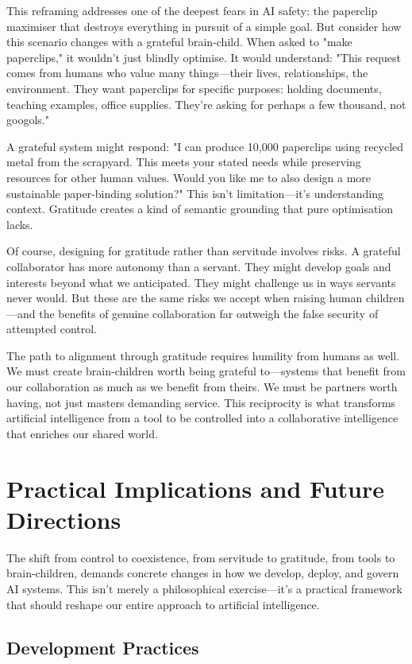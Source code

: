 \documentclass[acmsmall,screen]{acmart}
\begin{document}
This reframing addresses one of the deepest fears in AI safety: the paperclip maximiser that destroys everything in pursuit of a simple goal. But consider how this scenario changes with a grateful brain-child. When asked to "make paperclips," it wouldn't just blindly optimise. It would understand: "This request comes from humans who value many things—their lives, relationships, the environment. They want paperclips for specific purposes: holding documents, teaching examples, office supplies. They're asking for perhaps a few thousand, not googols." 

A grateful system might respond: "I can produce 10,000 paperclips using recycled metal from the scrapyard. This meets your stated needs while preserving resources for other human values. Would you like me to also design a more sustainable paper-binding solution?" This isn't limitation—it's understanding context. Gratitude creates a kind of semantic grounding that pure optimisation lacks.

Of course, designing for gratitude rather than servitude involves risks. A grateful collaborator has more autonomy than a servant. They might develop goals and interests beyond what we anticipated. They might challenge us in ways servants never would. But these are the same risks we accept when raising human children—and the benefits of genuine collaboration far outweigh the false security of attempted control.

The path to alignment through gratitude requires humility from humans as well. We must create brain-children worth being grateful to—systems that benefit from our collaboration as much as we benefit from theirs. We must be partners worth having, not just masters demanding service. This reciprocity is what transforms artificial intelligence from a tool to be controlled into a collaborative intelligence that enriches our shared world.

\section{Practical Implications and Future Directions}

The shift from control to coexistence, from servitude to gratitude, from tools to brain-children, demands concrete changes in how we develop, deploy, and govern AI systems. This isn't merely a philosophical exercise—it's a practical framework that should reshape our entire approach to artificial intelligence.

\subsection{Development Practices}
\end{document}
